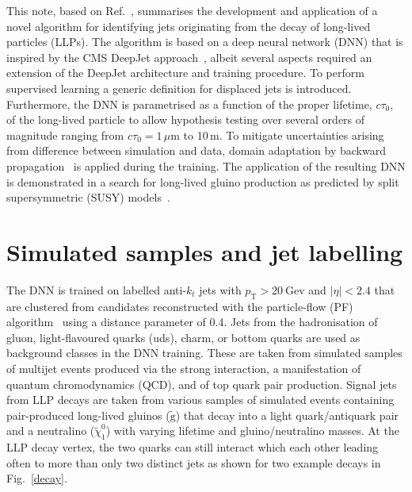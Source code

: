 \documentclass{webofc}
\newcommand{\tauo}{\ensuremath{c\tau_{0}}\xspace}
\newcommand{\ctau}{\ensuremath{c\tau_{0}}\xspace}
\newcommand{\gluino}{\ensuremath{\tilde{\textrm{g}}}\xspace}
\newcommand{\lsp}{\ensuremath{\tilde{\chi}_{1}^{0}}\xspace}
\newcommand{\pt}{\ensuremath{p_\textrm{T}}\xspace}
\begin{document}
This note, based on Ref.~\cite{CMS-EXO-19-011}, summarises the development and application of a novel algorithm for identifying jets originating from the decay of long-lived particles (LLPs). The algorithm is based on a deep neural network (DNN) that is inspired by the CMS DeepJet approach~\cite{dj}, albeit several aspects required an extension of the DeepJet architecture and training procedure. To perform supervised learning a generic definition for displaced jets is introduced. Furthermore, the DNN is parametrised as a function of the proper lifetime, \tauo, of the long-lived particle to allow hypothesis testing over several orders of magnitude ranging from $\ctau = 1\,\mu\textrm{m}$ to 10\,m. To mitigate uncertainties arising from difference between simulation and data, domain adaptation by backward propagation~\cite{da} is applied during the training. The application of the resulting DNN is demonstrated in a search for long-lived gluino production as predicted by split supersymmetric (SUSY) models~\cite{splitsusy}.

\section{Simulated samples and jet labelling}
\label{samples}

The DNN is trained on labelled anti-$k_t$ jets with $\pt>20~\mathrm{Gev}$ and $|\eta|<2.4$ that are clustered from candidates reconstructed with the particle-flow (PF) algorithm~\cite{pf} using a distance parameter of 0.4. Jets from the hadronisation of gluon, light-flavoured quarks (uds), charm, or bottom quarks are used as background classes in the DNN training. These are taken from simulated samples of multijet events produced via the strong interaction, a manifestation of quantum chromodynamics (QCD), and of top quark pair production. Signal jets from LLP decays are taken from various samples of simulated events containing pair-produced long-lived gluinos (\gluino) that decay into a light quark/antiquark pair and a neutralino (\lsp) with varying lifetime and gluino/neutralino masses. At the LLP decay vertex, the two quarks can still interact which each other leading often to more than only two distinct jets as shown for two example decays in Fig.~\ref{decay}.
\end{document}
